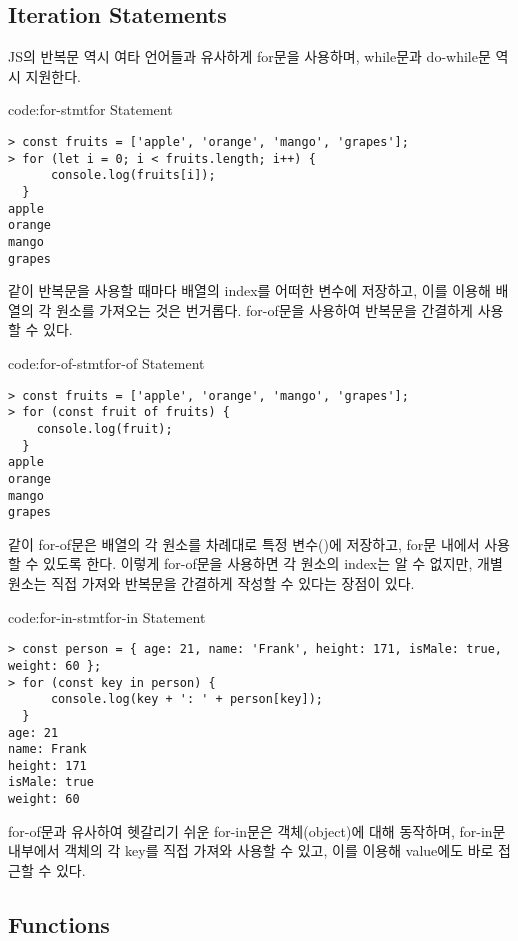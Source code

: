\subsection*{Iteration Statements}

JS의 반복문 역시 여타 언어들과 유사하게 for문을 사용하며, while문과 do-while문 역시 지원한다.

\begin{codeenv}{code:for-stmt}{for Statement}\begin{verbatim}
> const fruits = ['apple', 'orange', 'mango', 'grapes'];
> for (let i = 0; i < fruits.length; i++) {
      console.log(fruits[i]);
  }
apple
orange
mango
grapes
\end{verbatim}
\end{codeenv}

\와 같이 반복문을 사용할 때마다 배열의 index를 어떠한 변수에 저장하고, 이를 이용해 배열의 각 원소를 가져오는 것은 번거롭다. for-of문을 사용하여 반복문을 간결하게 사용할 수 있다.

\begin{codeenv}{code:for-of-stmt}{for-of Statement}\begin{verbatim}
> const fruits = ['apple', 'orange', 'mango', 'grapes'];
> for (const fruit of fruits) {
    console.log(fruit);
  }
apple
orange
mango
grapes
\end{verbatim}
\end{codeenv}

\와 같이 for-of문은 배열의 각 원소를 차례대로 특정 변수()에 저장하고, for문 내에서 사용할 수 있도록 한다. 이렇게 for-of문을 사용하면 각 원소의 index는 알 수 없지만, 개별 원소는 직접 가져와 반복문을 간결하게 작성할 수 있다는 장점이 있다.

\begin{codeenv}{code:for-in-stmt}{for-in Statement}\begin{verbatim}
> const person = { age: 21, name: 'Frank', height: 171, isMale: true, weight: 60 };
> for (const key in person) {
      console.log(key + ': ' + person[key]);
  }
age: 21
name: Frank
height: 171
isMale: true
weight: 60
\end{verbatim}
\end{codeenv}

for-of문과 유사하여 헷갈리기 쉬운 for-in문은 객체(object)에 대해 동작하며, for-in문 내부에서 객체의 각 key를 직접 가져와 사용할 수 있고, 이를 이용해 value에도 바로 접근할 수 있다.

\subsection*{Functions}

